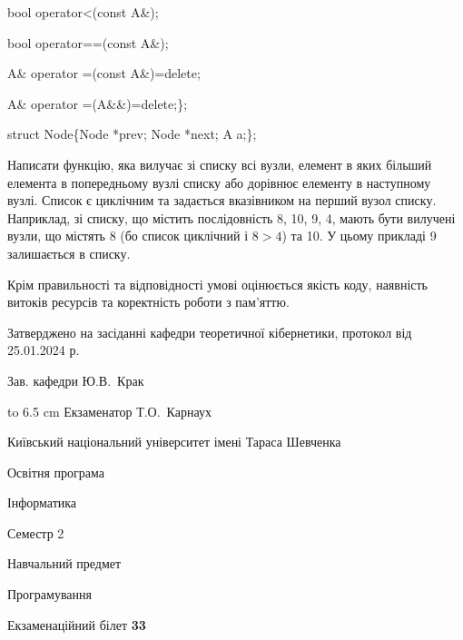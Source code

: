 \documentclass[12pt, ukrainian]{article}
\begin{document}
{\quad  bool operator<(const A\&); 

\quad  bool operator==(const A\&); 

\quad A\& operator =(const A\&)=delete; 

\quad  A\& operator =(A\&\&)=delete;\};

struct Node\{Node *prev; Node *next; A a;\};

Написати функцію, яка вилучає зі списку всі вузли, елемент в яких більший елемента в попередньому вузлі списку або дорівнює елементу в наступному вузлі. Список є циклічним та задається вказівником на перший вузол списку. Наприклад, зі списку, що містить послідовність 8, 10, 9, 4, мають бути вилучені вузли, що містять 8 (бо список циклічний і $8>4$) та 10. У цьому прикладі 9 залишається в списку.

Крім правильності та відповідності умові оцінюється якість коду, наявність витоків ресурсів та коректність роботи з пам'яттю. 

}
{\smallskip\smallskip \begin {scriptsize} Затверджено на засіданні кафедри теоретичної кібернетики, протокол   від   25.01.2024 р.\par\smallskip\smallskip\smallskip\smallskip
{\parbox {6.5 cm} {Зав. кафедри \dotfill Ю.В.~Крак}}\hspace {0.7cm} {\hbox to 6.5 cm { Екзаменатор \dotfill Т.О.~Карнаух}} \end{scriptsize}}
\newpage
{{\begin {scriptsize}\par
{ \center  Київський національний університет імені Тараса Шевченка \par}
{\parbox {5 cm}{Освітня програма \hfill}{\parbox {7 cm}{Інформатика\hfill}}\parbox {6 cm}{\hfill Семестр 2}}\par
{\parbox {5 cm} {Навчальний предмет \hfill}\parbox {7 cm}{Програмування \hfill}\parbox {6cm}{\hfill}\par}\vspace{-15pt} \end{scriptsize}}{\center Екзаменаційний білет \No \textbf { 33 }\par}}
\end{document}
